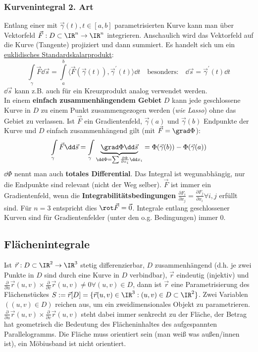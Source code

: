  \subsubsection{Kurvenintegral 2. Art}\label{kurvint2art}
 Entlang einer mit $\vec{\gamma}(t),t\in[a,b]$ parametrisierten Kurve kann man über Vektorfeld $\vec{F}:D\subset\IR^n\to\IR^n$ integrieren. Anschaulich wird das Vektorfeld auf die Kurve (Tangente) projiziert und dann summiert. Es handelt sich um ein \href{https://de.wikipedia.org/wiki/Standardskalarprodukt}{euklidisches Standardskalarprodukt}:
 \begin{equation}
 	\int\limits_\gamma\vec{F}\dd\vec{s}=\int\limits_a^b\langle \vec{F}(\vec{\gamma}(t)),\vec{\gamma}^\prime(t)\rangle\dd t \quad\text{besonders:}\quad \dd \vec{s}=\vec{\gamma}^\prime(t) \dd t
 \end{equation}
 $\dd\vec{s}$ kann z.B. auch für ein Kreuzprodukt analog verwendet werden. \\
 In einem \textbf{einfach zusammenhängendem Gebiet} $D$ kann jede geschlossene Kurve in $D$ zu einem Punkt zusammengezogen werden (\textit{wie Lasso}) ohne das Gebiet zu verlassen. Ist $\vec{F}$ ein Gradientenfeld, $\vec{\gamma}(a)$ und $\vec{\gamma}(b)$ Endpunkte der Kurve und $D$ einfach zusammenhängend gilt (mit $\vec{F}=\grad \Phi$):
 \begin{equation}\label{totDiff}
	\int\limits_\gamma \vec{F}\dd \vec{s}=\int\limits_\gamma\underbrace{ \grad \Phi \dd \vec{s}}_{\dd \Phi =\sum \frac{\partial \Phi}{\partial x_i}\dd x_i}=\Phi (\vec{\gamma}(b))-\Phi (\vec{\gamma}(a))
 \end{equation}
$\dd\Phi$ nennt man auch \textbf{totales Differential}. Das Integral ist wegunabhängig, nur die Endpunkte sind relevant (nicht der Weg selber). $\vec{F}$ ist immer ein Gradientenfeld, wenn die \textbf{Integrabilitätsbedingungen} $\frac{\partial F_i}{\partial x_j}=\frac{\partial F_j}{\partial x_i}\forall i,j$ erfüllt sind. Für $n=3$ entspricht dies $\rot \vec{F}=\vec{0}$. Integrale entlang geschlossener Kurven sind für Gradientenfelder (unter den o.g. Bedingungen) immer 0. 
 \subsection{Flächenintegrale}
 Ist $\vec{r}:D\subset \IR^2\to \IR^3$ stetig differenzierbar, $D$ zusammenhängend (d.h. je zwei Punkte in $D$ sind durch eine Kurve in $D$ verbindbar), $\vec{r}$ eindeutig (injektiv) und $\frac{\partial}{\partial u}\vec{r}(u,v)\times\frac{\partial}{\partial v}\vec{r}(u,v)\neq 0 \forall (u,v)\in D$, dann ist $\vec{r}$ eine Parametrisierung des Flächenstückes $S:=\vec{r}[D]=\{\vec{r}(u,v)\in\IR^3:(u,v)\in D\subset \IR^2\}$. Zwei Variablen $((u,v)\in D)$ reichen aus, um ein zweidimensionales Objekt zu parametrieren. $\frac{\partial}{\partial u}\vec{r}(u,v)\times\frac{\partial}{\partial v}\vec{r}(u,v)$ steht dabei immer senkrecht zu der Fläche, der Betrag hat geometrisch die Bedeutung des Flächeninhaltes des aufgespannten Parallelogramms. Die Fläche muss orientiert sein (man weiß was außen/innen ist), ein Möbiusband ist nicht orientiert.
